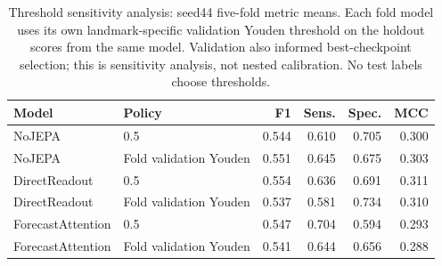 \begin{table}[t]
\centering
\small
\caption{Threshold sensitivity analysis: seed44 five-fold metric means. Each fold model uses its own landmark-specific validation Youden threshold on the holdout scores from the same model. Validation also informed best-checkpoint selection; this is sensitivity analysis, not nested calibration. No test labels choose thresholds.}
\label{tab:extended_threshold}
\begin{tabular}{llrrrr}
\toprule
Model & Policy & F1 & Sens. & Spec. & MCC \\
\midrule
NoJEPA & 0.5 & 0.544 & 0.610 & 0.705 & 0.300 \\
NoJEPA & Fold validation Youden & 0.551 & 0.645 & 0.675 & 0.303 \\
\midrule
DirectReadout & 0.5 & 0.554 & 0.636 & 0.691 & 0.311 \\
DirectReadout & Fold validation Youden & 0.537 & 0.581 & 0.734 & 0.310 \\
\midrule
ForecastAttention & 0.5 & 0.547 & 0.704 & 0.594 & 0.293 \\
ForecastAttention & Fold validation Youden & 0.541 & 0.644 & 0.656 & 0.288 \\
\bottomrule
\end{tabular}
\end{table}
